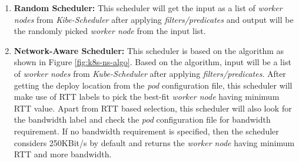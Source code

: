   \begin{enumerate}
    \item \textbf{Random Scheduler:} This scheduler will get the input as a list of \emph{worker nodes} from \emph{Kibe-Scheduler} after applying \emph{filters/predicates} and output will be the randomly picked \emph{worker node} from the input list\cite{Santos2019}.
    \item \textbf{Network-Aware Scheduler:} This scheduler is based on the algorithm as shown in Figure \ref{fig:k8s-ns-algo}. Based on the algorithm, input will be a list of \emph{worker nodes} from \emph{Kube-Scheduler} after applying \emph{filters/predicates}. After getting the deploy location from the \emph{pod} configuration file, this scheduler will make use of RTT labels to pick the best-fit \emph{worker node} having minimum RTT value\cite{Santos2019}. Apart from RTT based selection, this scheduler will also look for the bandwidth label and check the \emph{pod} configuration file for bandwidth requirement\cite{Santos2019}. If no bandwidth requirement is specified, then the scheduler considers 250KBit/s by default and returns the \emph{worker node} having minimum RTT and more bandwidth\cite{Santos2019}.
  \end{enumerate}
  \vspace{-0.6cm}
